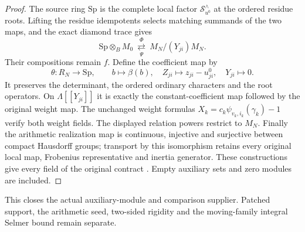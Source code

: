 \begin{proof}
The source ring \(\mathrm{Sp}\) is the complete local factor
\(\mathcal S^\wedge_{u^0}\) at the ordered residue roots.
Lifting the residue idempotents selects matching summands of
the two maps, and the exact diamond trace gives
\[
 \mathrm{Sp}\otimes_B M_0
      \ \underset{\Psi}{\stackrel{\Phi}{\rightleftarrows}}\
                         M_N/(Y_{ji})M_N.
\]
Their compositions remain \(f\).  Define the coefficient map by
\[
 \theta:R_N\longrightarrow\mathrm{Sp},\qquad
 b\longmapsto\beta(b),\quad Z_{ji}\longmapsto z_{ji}-u^0_{ji},
 \quad Y_{ji}\longmapsto0.
\]
It preserves the determinant, the ordered ordinary characters and
the root operators.  On \(\Lambda[[Y_{ji}]]\) it is exactly the
constant-coefficient map followed by the original weight map.
The unchanged weight formulas
\(X_k=c_k\psi_{v_k,i_k}(\gamma_k)-1\) verify both weight fields.
The displayed relation powers restrict to \(M_N\).
Finally the arithmetic realization map is continuous, injective
and surjective between compact Hausdorff groups; transport by
this isomorphism retains every original local map, Frobenius
representative and inertia generator.  These constructions give
every field of the original contract \cite{SelmerTWSource}.
Empty auxiliary sets and zero modules are included.
\end{proof}

This closes the actual auxiliary-module and comparison supplier.
Patched support, the arithmetic seed, two-sided rigidity and
the moving-family integral Selmer bound remain separate.
